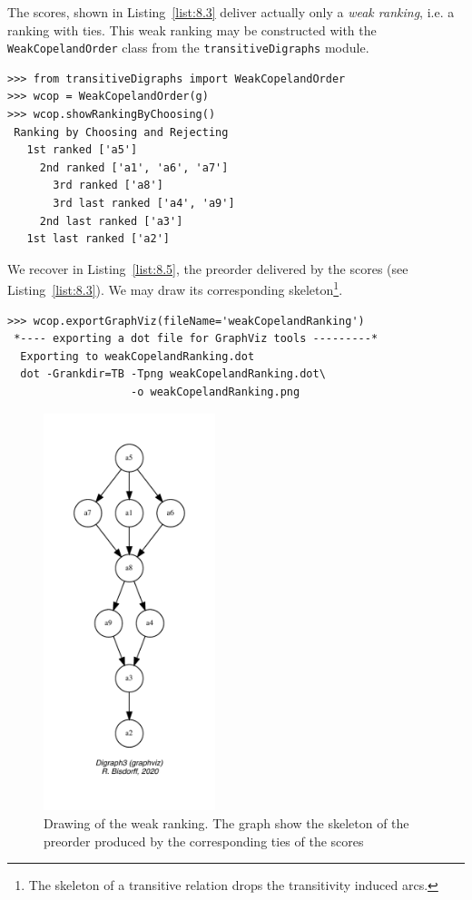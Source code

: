 The \Copeland scores, shown in Listing~\vref{list:8.3} deliver actually only a \emph{weak ranking}, i.e. a ranking with ties. This weak ranking may be constructed with the \texttt{WeakCopelandOrder} class  from the \texttt{transitiveDigraphs} module.
\begin{lstlisting}[caption={Computing a weak \Copeland ranking},label=list:8.5]
>>> from transitiveDigraphs import WeakCopelandOrder
>>> wcop = WeakCopelandOrder(g)
>>> wcop.showRankingByChoosing()
 Ranking by Choosing and Rejecting
   1st ranked ['a5']
     2nd ranked ['a1', 'a6', 'a7']
       3rd ranked ['a8']
       3rd last ranked ['a4', 'a9']
     2nd last ranked ['a3']
   1st last ranked ['a2']
\end{lstlisting}

We recover in Listing~\vref{list:8.5}, the preorder delivered by the \Copeland scores (see Listing~\vref{list:8.3}). We may draw its corresponding skeleton\footnote{The skeleton of a transitive relation drops the transitivity induced arcs.}.
\begin{lstlisting}
>>> wcop.exportGraphViz(fileName='weakCopelandRanking')
 *---- exporting a dot file for GraphViz tools ---------*
  Exporting to weakCopelandRanking.dot
  dot -Grankdir=TB -Tpng weakCopelandRanking.dot\
                   -o weakCopelandRanking.png
\end{lstlisting}
\begin{figure}[h]
\sidecaption[t]
\includegraphics[width=5cm]{Figures/8-2-weakCopelandRanking.pdf}
\caption{Drawing of the weak \Copeland ranking. The graph show the skeleton of the preorder produced by the corresponding ties of the \Copeland scores}
\label{fig:8.2}       %
\end{figure}


